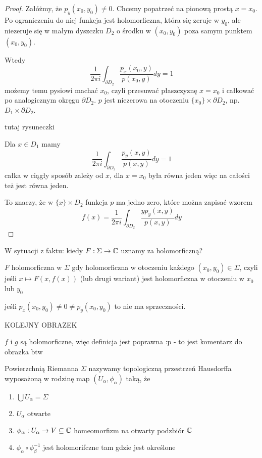 \begin{proof}
  Załóżmy, że $p_y(x_0, y_0)\neq 0$. Chcemy popatrzeć na pionową prostą $x=x_0$. Po ograniczeniu do niej funkcja jest holomorficzna, która się zeruje w $y_0$, ale niezeruje się w małym dyszczku $D_2$ o środku w $(x_0, y_0)$ poza samym punktem $(x_0, y_0)$.

  Wtedy
  $$\frac{1}{2\pi i}\int_{\partial D_2} \frac{p_x(x_0 ,y)}{p(x_0, y)} dy=1$$
  możemy temu pysiowi machać $x_0$, czyli przesuwać płaszczyznę $x=x_0$ i całkować po analogicznym okręgu $\partial D_2$. $p$ jest niezerowa na otoczeniu $\{x_0\}\times\partial D_2$, np. $D_1\times\partial D_2$.

  {\color{red}tutaj rysuneczki}

  Dla $x\in D_1$ mamy
  $$\frac{1}{2\pi i}\int_{\partial D_2}\frac{p_y(x,y)}{p(x,y)}dy=1$$
  całka w ciągły sposób zależy od $x$, dla $x=x_0$ była równa jeden więc na całości też jest równa jeden.

  To znaczy, że w $\{x\}\times D_2$ funkcja $p$ ma jedno zero, które można zapisać wzorem
  $$f(x)=\frac{1}{2\pi i}\int_{\partial D_2}\frac{yp_y(x,y)}{p(x,y)}dy$$
\end{proof}

W sytuacji z faktu: kiedy $F:\Sigma\to \mathbb{C}$ uznamy za holomorficzną?

  $F$ holomorficzna w $\Sigma$ gdy holomorficzna w otoczeniu każdego $(x_0, y_0)\in\Sigma$, czyli jeśli $x\mapsto F(x, f(x))$ (lub drugi wariant) jest holomorficzna w otoczeniu w $x_0$ lub $y_0$
  
jeśli $p_x(x_0, y_0)\neq 0\neq p_y(x_0, y_0)$ to nie ma sprzeczności.

KOLEJNY OBRAZEK

$f$ i $g$ są holomorficzne, więc definicja jest poprawna :p - to jest komentarz do obrazka btw

\begin{definition}{}{}
  Powierzchnią Riemanna $\Sigma$ nazywamy topologiczną przestrzeń Hausdorffa wyposażoną w rodzinę map $(U_\alpha, \phi_\alpha)$ taką, że 
  \begin{enumerate}
    \item $\bigcup U_\alpha=\Sigma$
    \item $U_\alpha$ otwarte
    \item $\phi_\alpha:U_\alpha\to V\subseteq \mathbb{C}$ homeomorfizm na otwarty podzbiór $\mathbb{C}$
    \item $\phi_\alpha\circ\phi_\beta^{-1}$ jest holomorifczne tam gdzie jest określone
  \end{enumerate}
\end{definition}

